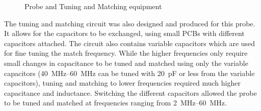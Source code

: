 \begin{figure}[tb]
\centering
{}
\caption{Probe and Tuning and Matching equipment}
\end{figure}

The tuning and matching circuit was also designed and produced for this probe.
It allows for the capacitors to be exchanged, using small PCBs with different capacitors attached.
The circuit also contains variable capacitors which are used for fine tuning the match frequency.
While the higher frequencies only require small changes in capacitance to be tuned and matched using only the variable capacitors (\SIrange[range-phrase = --]{40}{60}{MHz} can be tuned with \SI{20}{pF} or less from the variable capacitors), tuning and matching to lower frequencies required much higher capacitance and inductance.
Switching the different capacitors allowed the probe to be tuned and matched at frequencies ranging from \SIrange{2}{60}{\mega\hertz}.

